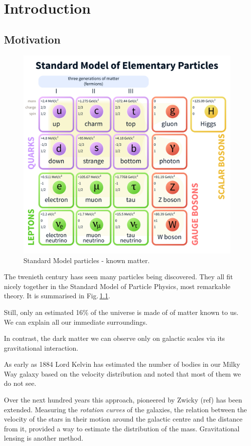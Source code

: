 %

\chapter{Introduction}
\label{ch:axions-intro}





\section{Motivation}
\begin{figure}
  \centering
  \includegraphics[width=0.5\linewidth]{gfx/axions/Standard_Model_of_Elementary_Particles.pdf}
  \caption{Standard Model particles - known matter.}
  \label{fig:axions_SM_particles}
\end{figure}

The twenieth century hass seen many particles being discovered. They all fit nicely together in the Standard Model of Particle Physics, most remarkable theory. It is summarised in Fig.\,\ref{fig:axions_SM_particles}.

Still, only an estimated 16\% of the universe is made of of matter known to us. We can explain all our immediate surroundings.

In contrast, the dark matter we can observe only on galactic scales via its gravitational interaction.

As early as 1884 Lord Kelvin has estimated the number of bodies in our Milky Way galaxy based on the velocity distribution and noted that most of them we do not see.

Over the next hundred years this approach, pioneered by Zwicky (ref) has been extended. Measuring the \emph{rotation curves} of the galaxies, the relation between the velocity of the stars in their motion around the galactic centre and the distance from it, provided a way to estimate the distribution of the mass. Gravitational lensing is another method.

